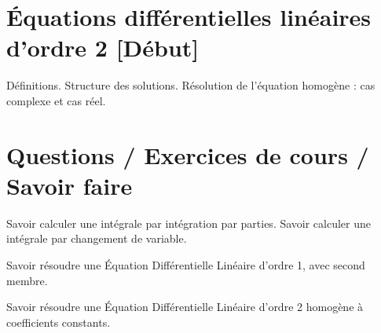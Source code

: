 \documentclass[a4paper,french,bookmarks]{article}
\begin{document}
\section*{Équations différentielles linéaires d’ordre 2 [Début]}

Définitions. Structure des solutions. Résolution de l’équation homogène : cas complexe et cas réel.

\section*{Questions / Exercices de cours / Savoir faire}

Savoir calculer une intégrale par intégration par parties.
Savoir calculer une intégrale par changement de variable.

Savoir résoudre une Équation Différentielle Linéaire d’ordre 1, avec second membre.

Savoir résoudre une Équation Différentielle Linéaire d’ordre 2 homogène à coefficients constants.
\end{document}
